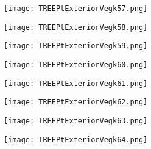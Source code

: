 \documentclass[pdf]{beamer}
\begin{document}
\begin{frame}
\begin{figure}[!h]
\centering
\texttt{[image: TREEPtExteriorVegk57.png]}
\end{figure}
\end{frame}

\begin{frame}
\begin{figure}[!h]
\centering
\texttt{[image: TREEPtExteriorVegk58.png]}
\end{figure}
\end{frame}

\begin{frame}
\begin{figure}[!h]
\centering
\texttt{[image: TREEPtExteriorVegk59.png]}
\end{figure}
\end{frame}

\begin{frame}
\begin{figure}[!h]
\centering
\texttt{[image: TREEPtExteriorVegk60.png]}
\end{figure}
\end{frame}

\begin{frame}
\begin{figure}[!h]
\centering
\texttt{[image: TREEPtExteriorVegk61.png]}
\end{figure}
\end{frame}

\begin{frame}
\begin{figure}[!h]
\centering
\texttt{[image: TREEPtExteriorVegk62.png]}
\end{figure}
\end{frame}

\begin{frame}
\begin{figure}[!h]
\centering
\texttt{[image: TREEPtExteriorVegk63.png]}
\end{figure}
\end{frame}

\begin{frame}
\begin{figure}[!h]
\centering
\texttt{[image: TREEPtExteriorVegk64.png]}
\end{figure}
\end{frame}
\end{document}

